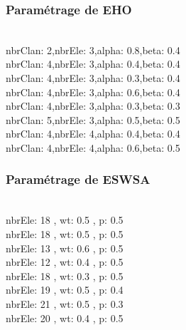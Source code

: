 \noindent
\begin{minipage}[t]{0.55\textwidth}
\subsubsection{Paramétrage de EHO}
\vspace{-0.5cm}
\textbf{}\\
nbrClan: 2,nbrEle: 3,alpha: 0.8,beta: 0.4\\
nbrClan: 4,nbrEle: 3,alpha: 0.4,beta: 0.4\\
nbrClan: 4,nbrEle: 3,alpha: 0.3,beta: 0.4\\
nbrClan: 4,nbrEle: 3,alpha: 0.6,beta: 0.4\\
nbrClan: 4,nbrEle: 3,alpha: 0.3,beta: 0.3\\
nbrClan: 5,nbrEle: 3,alpha: 0.5,beta: 0.5\\
nbrClan: 4,nbrEle: 4,alpha: 0.4,beta: 0.4\\
nbrClan: 4,nbrEle: 4,alpha: 0.6,beta: 0.5
\end{minipage}\hfill
\begin{minipage}[t]{0.4\textwidth}
\subsubsection{Paramétrage de ESWSA}
\vspace{-0.5cm}
\textbf{}\\
nbrEle: 18 , wt: 0.5 , p: 0.5\\
nbrEle: 18 , wt: 0.5 , p: 0.5\\
nbrEle: 13 , wt: 0.6 , p: 0.5\\
nbrEle: 12 , wt: 0.4 , p: 0.5\\
nbrEle: 18 , wt: 0.3 , p: 0.5\\
nbrEle: 19 , wt: 0.5 , p: 0.4\\
nbrEle: 21 , wt: 0.5 , p: 0.3\\
nbrEle: 20 , wt: 0.4 , p: 0.5
\end{minipage}\hfill


